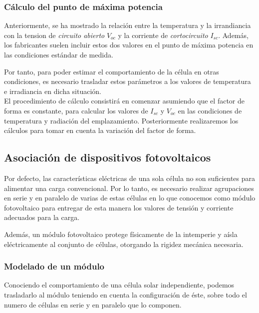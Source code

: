 \subsubsection{Cálculo del punto de máxima potencia}

Anteriormente, se ha mostrado la relación entre la temperatura y la irrandiancia con la tension de \textit{circuito abierto} $V_{oc}$ y la corriente de \textit{cortocircuito} $I_{sc}$. Además, los fabricantes suelen incluir estos dos valores en el punto de máxima potencia en las condiciones estándar de medida.

Por tanto, para poder estimar el comportamiento de la célula en otras condiciones, es necesario trasladar estos parámetros a los valores de temperatura e irradiancia en dicha situación.\\

El procedimiento de cálculo consistirá en comenzar asumiendo que el factor de forma es constante, para calcular los valores de $I_{sc}$ y $V_{oc}$ en las condiciones de temperatura y radiación del emplazamiento. Posteriormente realizaremos los cálculos para tomar en cuenta la variación del factor de forma.



\subsection{Asociación de dispositivos fotovoltaicos}

Por defecto, las características eléctricas de una sola célula no son suficientes para alimentar una carga convencional. Por lo tanto, es necesario realizar agrupaciones en serie y en paralelo de varias de estas células en lo que conocemos como módulo fotovoltaico para entregar de esta manera los valores de tensión y corriente adecuados para la carga.

Además, un módulo fotovoltaico protege físicamente de la intemperie y aísla eléctricamente al conjunto de células, otorgando la rigidez mecánica necesaria.

\subsubsection{Modelado de un módulo}

Conociendo el comportamiento de una célula solar independiente, podemos trasladarlo al módulo teniendo en cuenta la configuración de éste, sobre todo el numero de células en serie y en paralelo que lo componen.

